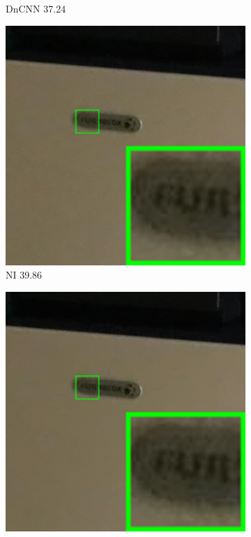 \begin{figure}
\begin{subfigure}[t]{0.19\textwidth}
		\caption{DnCNN 37.24}
    \end{subfigure}
    \hfill
    \begin{subfigure}[t]{0.19\textwidth}
        \centering
        \includegraphics[width=1\textwidth]{images/guided/our/resize_br_NI_Canon_80D_ISO12800_IMG_2360_part10.png}
		\caption{NI 39.86}
    \end{subfigure}
    \hfill
    \begin{subfigure}[t]{0.19\textwidth}
        \centering
        \includegraphics[width=1\textwidth]{images/guided/our/resize_br_NC_Canon_80D_ISO12800_IMG_2360_part10.png}

\end{subfigure}
\end{figure}
